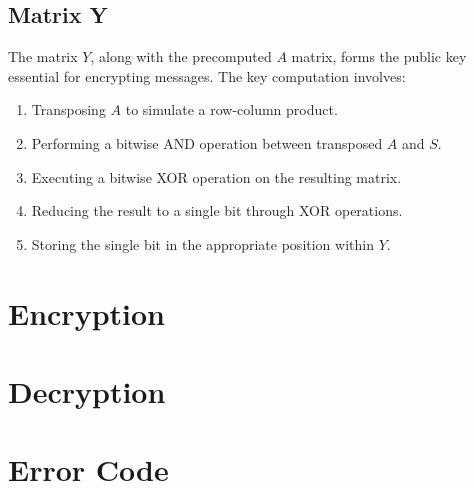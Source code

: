 \subsection{Matrix Y}
The matrix \(Y\), along with the precomputed \(A\) matrix, forms the public key essential for encrypting messages. The key computation involves:
\begin{enumerate}
    \item Transposing \(A\) to simulate a row-column product.
    \item Performing a bitwise AND operation between transposed \(A\) and \(S\).
    \item Executing a bitwise XOR operation on the resulting matrix.
    \item Reducing the result to a single bit through XOR operations.
    \item Storing the single bit in the appropriate position within \(Y\).
\end{enumerate}

\section{Encryption}
\section{Decryption}
\section{Error Code}